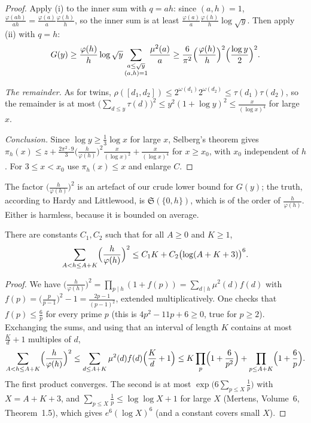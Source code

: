 \begin{proof}
Apply (i) to the inner sum with $q=ah$: since $(a,h)=1$, $\frac{\varphi(ah)}{ah}=\frac{\varphi(a)}a\frac{\varphi(h)}h$, so the inner sum is at least
$\frac{\varphi(a)}a\frac{\varphi(h)}h\log\sqrt y$. Then apply (ii) with $q=h$:
\[
G(y)\ge\frac{\varphi(h)}h\log\sqrt y\sum_{\substack{a\le\sqrt y\\(a,h)=1}}\frac{\mu^2(a)}a\ge\frac6{\pi^2}\Bigl(\frac{\varphi(h)}h\Bigr)^2\Bigl(\frac{\log y}2\Bigr)^2.
\]

\emph{The remainder.} As for twins, $\rho([d_1,d_2])\le2^{\omega(d_1)}2^{\omega(d_2)}\le\tau(d_1)\tau(d_2)$, so the remainder is at most
$\bigl(\sum_{d\le y}\tau(d)\bigr)^2\le y^2(1+\log y)^2\le\frac x{(\log x)^4}$ for large $x$.

\emph{Conclusion.} Since $\log y\ge\frac13\log x$ for large $x$, Selberg's theorem gives
$\pi_h(x)\le z+\frac{2\pi^2\cdot9}3\bigl(\frac h{\varphi(h)}\bigr)^2\frac x{(\log x)^2}+\frac x{(\log x)^4}$ for $x\ge x_0$, with $x_0$ independent of $h$. For
$3\le x<x_0$ use $\pi_h(x)\le x$ and enlarge $C$.
\end{proof}

The factor $\bigl(\frac h{\varphi(h)}\bigr)^2$ is an artefact of our crude lower bound for $G(y)$; the truth, according to Hardy and Littlewood, is
$\mathfrak S(\{0,h\})$, which is of the order of $\frac h{\varphi(h)}$. Either is harmless, because it is bounded on average.

\begin{lemma}\label{conjectures:lem:hphi}
There are constants $C_1,C_2$ such that for all $A\ge0$ and $K\ge1$,
\[
\sum_{A<h\le A+K}\Bigl(\frac h{\varphi(h)}\Bigr)^2\le C_1K+C_2\bigl(\log(A+K+3)\bigr)^6.
\]
\end{lemma}
\begin{proof}
We have $\bigl(\frac h{\varphi(h)}\bigr)^2=\prod_{p\mid h}(1+f(p))=\sum_{d\mid h}\mu^2(d)f(d)$ with $f(p)=\bigl(\frac p{p-1}\bigr)^2-1=\frac{2p-1}{(p-1)^2}$, extended
multiplicatively. One checks that $f(p)\le\frac6p$ for every prime $p$ (this is $4p^2-11p+6\ge0$, true for $p\ge2$). Exchanging the sums, and using
that an interval of length $K$ contains at most $\frac Kd+1$ multiples of $d$,
\[
\sum_{A<h\le A+K}\Bigl(\frac h{\varphi(h)}\Bigr)^2\le\sum_{d\le A+K}\mu^2(d)f(d)\Bigl(\frac Kd+1\Bigr)\le K\prod_p\Bigl(1+\frac6{p^2}\Bigr)+\prod_{p\le A+K}\Bigl(1+\frac6p\Bigr).
\]
The first product converges. The second is at most $\exp\bigl(6\sum_{p\le X}\frac1p\bigr)$ with $X=A+K+3$, and $\sum_{p\le X}\frac1p\le\log\log X+1$ for large $X$
(Mertens, Volume~6, Theorem~1.5), which gives $e^6(\log X)^6$ (and a constant covers small $X$).
\end{proof}

